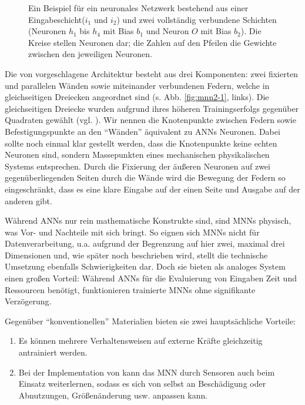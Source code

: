 \begin{figure}[htbp!]
{
    }
    \caption{Ein Beispiel für ein neuronales Netzwerk bestehend aus einer Eingabeschicht($i_1$ und $i_2$) und zwei vollständig verbundene Schichten (Neuronen $h_1$ bis $h_4$ mit Bias $b_1$ und Neuron $O$ mit Bias $b_2$). 
    Die Kreise stellen Neuronen dar; die Zahlen auf den Pfeilen die Gewichte zwischen den jeweiligen Neuronen.}
    \label{fig:dense_nn}
\end{figure}

Die von \lee{} vorgeschlagene Architektur besteht aus drei Komponenten: zwei fixierten und parallelen Wänden sowie miteinander verbundenen Federn, welche in gleichseitigen Dreiecken angeordnet sind  (s. Abb. \ref{fig:mnn2-1}, links).
Die gleichseitigen Dreiecke wurden aufgrund ihres höheren Trainingserfolgs gegenüber Quadraten gewählt (vgl. \cite[Abb. 5]{Lee2022}).
Wir nennen die Knotenpunkte zwischen Federn sowie Befestigungspunkte an den \enquote{Wänden} äquivalent zu ANNs Neuronen.
Dabei sollte noch einmal klar gestellt werden, dass die Knotenpunkte keine echten Neuronen sind, sondern Massepunkten eines mechanischen physikalischen Systems entsprechen.
Durch die Fixierung der äußeren Neuronen auf zwei gegenüberliegenden Seiten durch die Wände wird die Bewegung der Federn so eingeschränkt, dass es eine klare Eingabe auf der einen Seite und Ausgabe auf der anderen gibt.

Während ANNs nur rein mathematische Konstrukte sind, sind MNNs physisch, was Vor- und Nachteile mit sich bringt. 
So eignen sich MNNs nicht für Datenverarbeitung, u.a. aufgrund der Begrenzung auf hier zwei, maximal drei Dimensionen und, wie später noch beschrieben wird, stellt die technische Umsetzung ebenfalls Schwierigkeiten dar.
Doch sie bieten als analoges System einen großen Vorteil: Während ANNs für die Evaluierung von Eingaben Zeit und Ressourcen benötigt, funktionieren trainierte MNNs ohne signifikante Verzögerung.

Gegenüber \enquote{konventionellen} Materialien bieten sie zwei hauptsächliche Vorteile:

\begin{enumerate}
    \item Es können mehrere Verhaltensweisen auf externe Kräfte gleichzeitig antrainiert werden.
    \item Bei der Implementation von \lee{} kann das MNN durch Sensoren auch beim Einsatz weiterlernen, sodass es sich von selbst an Beschädigung oder Abnutzungen, Größenänderung usw. anpassen kann.
\end{enumerate}

